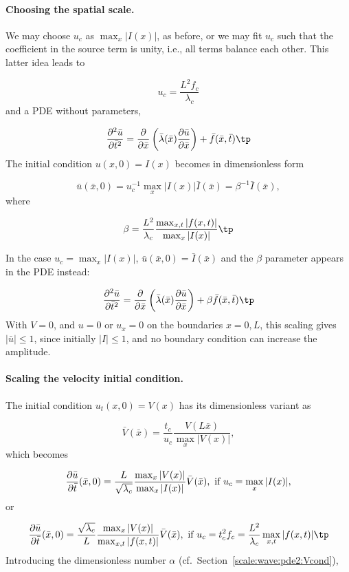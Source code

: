 \documentclass[graybox,envcountchap,sectrefs,final]{svmonodo}
\begin{document}
\paragraph{Choosing the spatial scale.}
We may choose $u_c$ as $\max_x |I(x)|$, as before,
or we may fit $u_c$ such that the coefficient in the source term
is unity, i.e., all terms balance each other.
This latter idea leads to

\[ u_c = \frac{L^2 f_c}{\lambda_c} \]
and a PDE without parameters,

\[
\frac{\partial^2 \bar u}{\partial \bar t^2} =
\frac{\partial}{\partial \bar x}\left(
\bar\lambda(\bar x) {\partial\bar u\over\partial\bar x}\right)
+ \bar f(\bar x,\bar t)\tp
\]
The initial condition $u(x,0)=I(x)$ becomes in dimensionless form

\[ \bar u(\bar x, 0) = u_c^{-1} \max_x |I(x)|\bar I(\bar x) =
\beta^{-1}\bar I(\bar x),\]
where

\[ \beta = \frac{L^2}{\lambda_c}\frac{\max_{x,t} |f(x,t)|}{\max_x|I(x)|}\tp\]

In the case $u_c=\max_x|I(x)|$, $\bar u(\bar x,0)=\bar I(\bar x)$ and
the $\beta$ parameter appears in the PDE instead:

\[
\frac{\partial^2 \bar u}{\partial \bar t^2} =
\frac{\partial}{\partial \bar x}\left(
\bar\lambda(\bar x) {\partial\bar u\over\partial\bar x}\right)
+ \beta \bar f(\bar x,\bar t)\tp
\]
With $V=0$, and $u=0$ or $u_x=0$ on the boundaries $x=0,L$, this scaling gives
$|\bar u|\leq 1$, since initially $|I|\leq 1$, and no boundary condition
can increase the amplitude.

\paragraph{Scaling the velocity initial condition.}
The initial condition $u_t(x,0)=V(x)$ has its dimensionless variant as

\[ \bar V(\bar x) = \frac{t_c}{u_c}\frac{V(L\bar x)}{\max_x|V(x)|},\]
which becomes

\[ \frac{\partial\bar u}{\partial\bar t}(\bar x, 0) =
\frac{L}{\sqrt{\lambda_c}}\frac{\max_{x}|V(x)|}{\max_{x}|I(x)|}\bar V(\bar x),
\hbox{ if } u_c=\max_x|I(x)|,\]
or

\[ \frac{\partial\bar u}{\partial\bar t}(\bar x, 0) =
\frac{\sqrt{\lambda_c}}{L}\frac{\max_{x}|V(x)|}{\max_{x,t}|f(x,t)|}
\bar V(\bar x),
\hbox{ if } u_c=t_c^2f_c=\frac{L^2}{\lambda_c}\max_{x,t}|f(x,t)|\tp\]
Introducing the dimensionless number $\alpha$ (cf.~Section~\ref{scale:wave:pde2:Vcond}),
\end{document}
